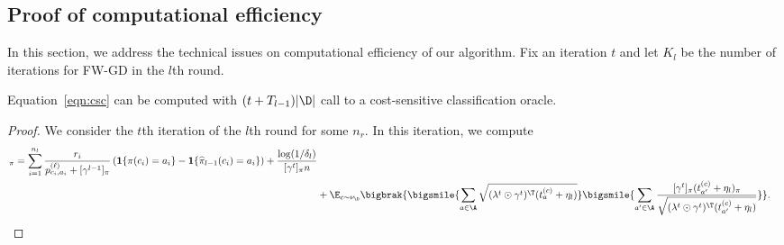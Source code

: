 \documentclass{article}
\newcommand{\pill}{\widehat{\pi}_{l-1}}
\newcommand{\1}{\mathbf{1}}
\begin{document}
\subsection{Proof of computational efficiency}\label{sec:proof_csc}

In this section, we address the technical issues on computational efficiency of our algorithm. Fix an iteration $t$ and let $K_l$ be the number of iterations for \textsf{FW-GD} in the $l$th round. 
\begin{lemma}\label{lem:csc}
Equation~\eqref{eqn:csc} can be computed with $(t+T_{l-1})|\D|$ call to a cost-sensitive classification oracle. 
\end{lemma}

\begin{proof}
We consider the $t$th iteration of the $l$th round for some $n_r$. In this iteration, we compute
\begin{align*}
    [\nabla_\lambda h_l(\lambda^{t},&\gamma^{t},n_r)]_\pi=\sum_{i=1}^{n_l}\frac{r_i}{p^{(\ell)}_{c_i,a_i}+[\gamma^{l-1}]_\pi}\left(\1\{\pi(c_i)=a_i\}-\1\{\pill(c_i)=a_i\}\right)+\frac{\log(1/\delta_l)}{[\gamma^{t}]_\pi n}\\
    &+\E_{c\sim\nu_\D}\bigbrak{\bigsmile{\sum_{a\in\A}\sqrt{(\lambda^{t}\odot \gamma^{t})^\T (t_a^{(c)}+\eta_l)}}\bigsmile{\sum_{a'\in\A}\frac{[\gamma^{t}]_\pi(t_{a'}^{(c)}+\eta_l)_\pi}{\sqrt{(\lambda^{t}\odot \gamma^{t})^\T (t_{a'}^{(c)}+\eta_l)}}}}.
\end{align*}


\end{proof}
\end{document}
